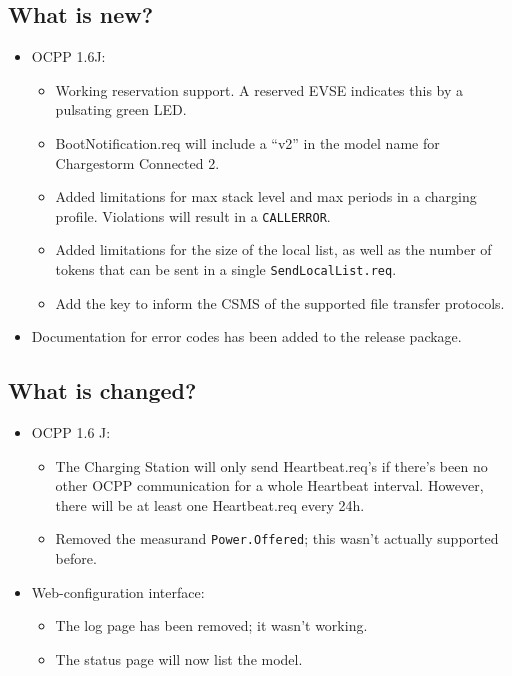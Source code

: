 \documentclass{scrartcl}
\begin{document}
\subsection*{What is new?}
\begin{itemize}
\item OCPP 1.6J:
  \begin{itemize}
  \item Working reservation support. A reserved EVSE indicates this by a
    pulsating green LED.
  \item BootNotification.req will include a ``v2'' in the model name for
    Chargestorm Connected 2.
  \item Added limitations for max stack level and max periods in a charging
    profile. Violations will result in a \verb|CALLERROR|.
  \item Added limitations for the size of the local list, as well as the
    number of tokens that can be sent in a single \verb|SendLocalList.req|.
  \item Add the key to inform the CSMS of the supported file transfer
    protocols.
  \end{itemize}
\item Documentation for error codes has been added to the release package.
\end{itemize}
\subsection*{What is changed?}
\begin{itemize}
\item OCPP 1.6 J:
  \begin{itemize}
  \item The Charging Station will only send Heartbeat.req's if there's been no
    other OCPP communication for a whole Heartbeat interval. However, there
    will be at least one Heartbeat.req every 24h.
  \item Removed the measurand \verb|Power.Offered|; this wasn't actually
    supported before.
  \end{itemize}
\item Web-configuration interface:
  \begin{itemize}
  \item The log page has been removed; it wasn't working.
  \item The status page will now list the model.
  \end{itemize}
\end{itemize}
\end{document}
